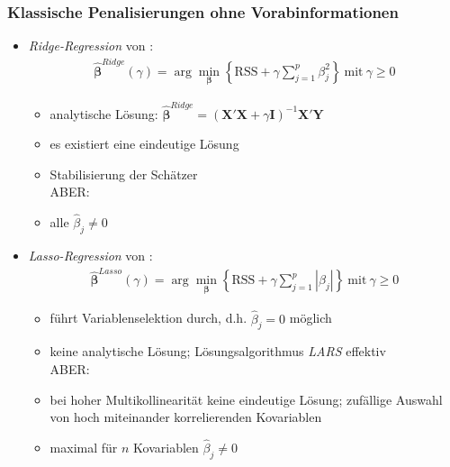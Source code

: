 \documentclass{beamer}
\begin{document}
\begin{frame}
\frametitle{\glqq Klassische{\grqq} Penalisierungen ohne Vorabinformationen}
	\begin{itemize}
	\item \textit{Ridge-Regression} von \cite{hoerl_ridge_1970}:
	\begin{align*}
	\boldsymbol{\hat{\beta}}^{Ridge}(\gamma)=\arg \displaystyle\min_{\boldsymbol{\beta}} \left\lbrace \text{RSS}  + \gamma \sum_{j=1}^{p}\beta_j^2 \right\rbrace \ \text{mit} \ \gamma \ge 0
	\end{align*}
	\begin{itemize}
	\item analytische Lösung: $\boldsymbol{\hat{\beta}}^{Ridge} = (\mathbf{X}'\mathbf{X} + \gamma \mathbf{I})^{-1}\mathbf{X}'\mathbf{Y}$
	\item es existiert eine eindeutige Lösung
	\item Stabilisierung der Schätzer\\
	ABER:\\ 
	\item alle $\hat{\beta}_j \neq 0$
	
	\end{itemize}
	\end{itemize}
\end{frame}



\begin{frame}
	\begin{itemize}
	\item \textit{Lasso-Regression} von \cite{tibshirani96regression}:
	\begin{align*}
	\boldsymbol{\hat{\beta}}^{Lasso}(\gamma)=\arg \displaystyle\min_{\boldsymbol{\beta}} \left\lbrace \text{RSS}  + \gamma \sum_{j=1}^{p}|\beta_j| \right\rbrace \ \text{mit} \ \gamma \ge 0
	\end{align*}
	\begin{itemize}
	\item führt Variablenselektion durch, d.h. $\hat{\beta}_j = 0$ möglich
	\item keine analytische Lösung; Lösungsalgorithmus \textit{LARS} \cite{Efron04leastangle} effektiv\\
	ABER:\\
	\item bei hoher Multikollinearität keine eindeutige Lösung; zufällige Auswahl von hoch miteinander korrelierenden Kovariablen
	\item maximal für $n$ Kovariablen $\hat{\beta}_j \neq 0$ 
	\end{itemize}
	\end{itemize}
\end{frame}
\end{document}
